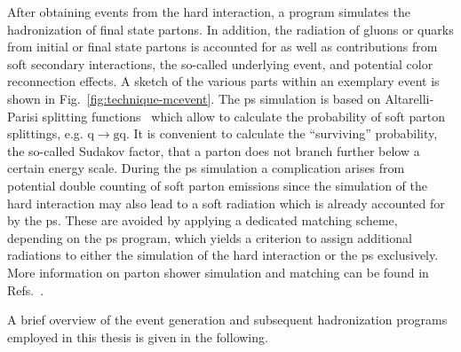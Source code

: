 After obtaining events from the hard interaction, a  program simulates the hadronization of final state partons. In addition, the radiation of gluons or quarks from initial or final state partons is accounted for as well as contributions from soft secondary interactions, the so-called underlying event, and potential color reconnection effects. A sketch of the various parts within an exemplary event is shown in Fig.~\ref{fig:technique-mcevent}. The \gls{ps} simulation is based on Altarelli-Parisi splitting functions~\cite{Altarelli:1977zs} which allow to calculate the probability of soft parton splittings, e.g. $\mathrm{q}\to \mathrm{gq}$. It is convenient to calculate the ``surviving'' probability, the so-called Sudakov factor, that a parton does not branch further below a certain energy scale. During the \gls{ps} simulation a complication arises from potential double counting of soft parton emissions since the simulation of the hard interaction may also lead to a soft radiation which is already accounted for by the \gls{ps}. These are avoided by applying a dedicated matching scheme, depending on the \gls{ps} program, which yields a criterion to assign additional radiations to either the simulation of the hard interaction or the \gls{ps} exclusively. More information on parton shower simulation and matching can be found in Refs.~\cite{Hoche:2014rga,Hoche:2006ph}.



A brief overview of the event generation and subsequent hadronization programs employed in this thesis is given in the following.

